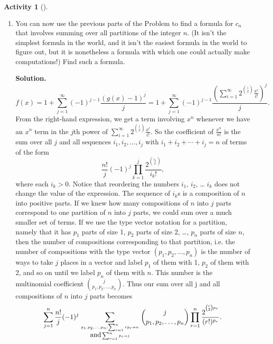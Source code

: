 \documentclass[10pt,]{book}
\theoremstyle{plain}
\theoremstyle{definition}
\newtheorem{activity}[project]{Activity}
\numberwithin{equation}{chapter}
\begin{document}
\begin{activity}[]
\begin{enumerate}[label=(\alph*)]
~\par
\item You can now use the previous parts of the Problem to find a formula for \(c_n\) that involves summing over all partitions of the integer \(n\). (It isn't the simplest formula in the world, and it isn't the easiest formula in the world to figure out, but it is nonetheless a formula with which one could actually make computations!)  Find such a  formula.%
\par\medskip\noindent%
\textbf{Solution.}\quad %
\begin{equation*}
f(x) = 1+\sum_{j=1}^\infty
(-1)^{j-1}\frac{(g(x)-1)^j}{j}= 1+\sum_{j=1}^\infty
(-1)^{j-1}\frac{(\sum_{i=1}^\infty 2^\binom{i}{2}\frac{x^i}{i!})^j}{j}.
\end{equation*}
From the right-hand expression, we get a term involving \(x^n\) whenever we have an \(x^n\) term in the \(j\)th power of \(\sum_{i=1}^\infty 2^\binom{i}{2}\frac{x^i}{i!}\). So the coefficient of \(\frac{x^n}{n!}\) is the sum over all \(j\) and all sequences \(i_1,i_2,\ldots,i_j\) with \(i_1+i_2+\cdots+i_j = n\) of terms of the form%
\begin{equation*}
\frac{n!}{j}(-1)^j\prod_{k=1}^j \frac{2^\binom{i_k}{2}
}{i_k!},
\end{equation*}
where each \(i_k>0\). Notice that reordering the numbers \(i_1\), \(i_2\), \dots{} \(i_k\) does not change the value of the expression. The sequence of \(i_k\)s is a composition of \(n\) into positive parts. If we knew how many compositions of \(n\) into \(j\) parts correspond to one partition of \(n\) into \(j\) parts, we could sum over a much smaller set of terms. If we use the type vector notation for a partition, namely that it has \(p_1\) parts of size 1, \(p_2\) parts of size 2, \dots{}, \(p_n\) parts of size \(n\), then the number of compositions corresponding to that partition, i.e. the number of compositions with the type vector \((p_1,p_2, \ldots, p_n)\) is the number of ways to take \(j\) places in a vector and label \(p_1\) of them with 1, \(p_2\) of them with 2, and so on until we label \(p_n\) of them with \(n\). This number is the multinomial coefficient \(\binom{j}{p_1,p_2,\ldots, p_n}\). Thus our sum over all j and all compositions of \(n\) into \(j\) parts becomes%
\begin{equation*}
\sum_{j=1}^n \frac{n!}{j}(-1)^j\sum_{{p_1,p_2,\ldots,p_n: \sum_{r=1}^n
rp_r =n \atop \mbox{and}  \sum_{r=1}^n p_r =j}}\binom{j}{p_1, p_2, \ldots,
p_n}
\prod_{r=1}^n\frac{2^{^{\binom{r}{2}p_r}}
}{(r!)^{p_r}}.
\end{equation*}

\end{enumerate}
\end{activity}
\end{document}
